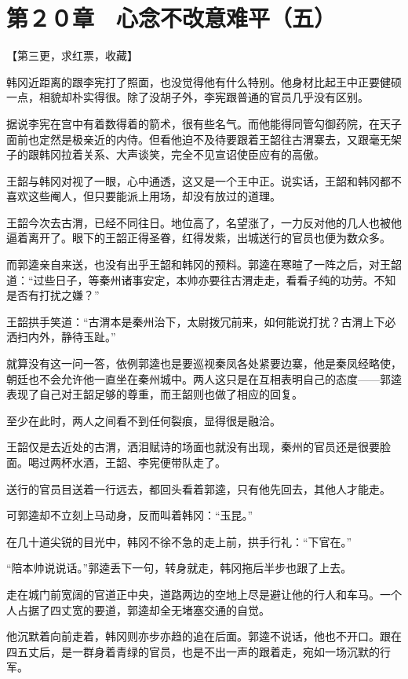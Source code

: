 \section{第２０章　心念不改意难平（五）}

【第三更，求红票，收藏】

韩冈近距离的跟李宪打了照面，也没觉得他有什么特别。他身材比起王中正要健硕一点，相貌却朴实得很。除了没胡子外，李宪跟普通的官员几乎没有区别。

据说李宪在宫中有着数得着的箭术，很有些名气。而他能得同管勾御药院，在天子面前也定然是极亲近的内侍。但看他迫不及待要跟着王韶往古渭寨去，又跟毫无架子的跟韩冈拉着关系、大声谈笑，完全不见宣诏使臣应有的高傲。

王韶与韩冈对视了一眼，心中通透，这又是一个王中正。说实话，王韶和韩冈都不喜欢这些阉人，但只要能派上用场，却没有放过的道理。

王韶今次去古渭，已经不同往日。地位高了，名望涨了，一力反对他的几人也被他逼着离开了。眼下的王韶正得圣眷，红得发紫，出城送行的官员也便为数众多。

而郭逵亲自来送，也没有出乎王韶和韩冈的预料。郭逵在寒暄了一阵之后，对王韶道：“过些日子，等秦州诸事安定，本帅亦要往古渭走走，看看子纯的功劳。不知是否有打扰之嫌？”

王韶拱手笑道：“古渭本是秦州治下，太尉拨冗前来，如何能说打扰？古渭上下必洒扫内外，静待玉趾。”

就算没有这一问一答，依例郭逵也是要巡视秦凤各处紧要边寨，他是秦凤经略使，朝廷也不会允许他一直坐在秦州城中。两人这只是在互相表明自己的态度——郭逵表现了自己对王韶足够的尊重，而王韶则也做了相应的回复。

至少在此时，两人之间看不到任何裂痕，显得很是融洽。

王韶仅是去近处的古渭，洒泪赋诗的场面也就没有出现，秦州的官员还是很要脸面。喝过两杯水酒，王韶、李宪便带队走了。

送行的官员目送着一行远去，都回头看着郭逵，只有他先回去，其他人才能走。

可郭逵却不立刻上马动身，反而叫着韩冈：“玉昆。”

在几十道尖锐的目光中，韩冈不徐不急的走上前，拱手行礼：“下官在。”

“陪本帅说说话。”郭逵丢下一句，转身就走，韩冈拖后半步也跟了上去。

走在城门前宽阔的官道正中央，道路两边的空地上尽是避让他的行人和车马。一个人占据了四丈宽的要道，郭逵却全无堵塞交通的自觉。

他沉默着向前走着，韩冈则亦步亦趋的追在后面。郭逵不说话，他也不开口。跟在四五丈后，是一群身着青绿的官员，也是不出一声的跟着走，宛如一场沉默的行军。

